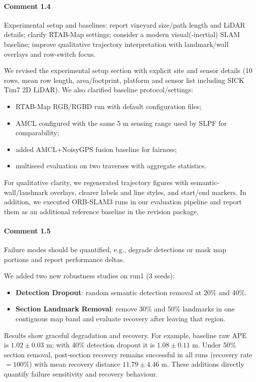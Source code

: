 \documentclass[a4paper]{article}
\def\answer#1#2{\begin{tcolorbox}[width=\textwidth,colback={white},title={\textbf{Answer
 #1}},colbacktitle=answerBoxColor,coltitle=white] #2 \end{tcolorbox} }
\begin{document}
\paragraph{Comment 1.4}
{\color{commentColor}
Experimental setup and baselines: report vineyard size/path length and LiDAR details; clarify RTAB-Map settings; consider a modern visual(-inertial) SLAM baseline; improve qualitative trajectory interpretation with landmark/wall overlays and row-switch focus.
}
\answer{1.4}{
We revised the experimental setup section with explicit site and sensor details (10 rows, mean row length, area/footprint, platform and sensor list including SICK Tim7 2D LiDAR).
We also clarified baseline protocol/settings:
\begin{itemize}
  \item RTAB-Map RGB/RGBD run with default configuration files;
  \item AMCL configured with the same 5 m sensing range used by SLPF for comparability;
  \item added AMCL+NoisyGPS fusion baseline for fairness;
  \item multiseed evaluation on two traverses with aggregate statistics.
\end{itemize}
For qualitative clarity, we regenerated trajectory figures with semantic-wall/landmark overlays, clearer labels and line styles, and start/end markers.
In addition, we executed ORB-SLAM3 runs in our evaluation pipeline and report them as an additional reference baseline in the revision package.
}

\paragraph{Comment 1.5}
{\color{commentColor}
Failure modes should be quantified, e.g., degrade detections or mask map portions and report performance deltas.
}
\answer{1.5}{
We added two new robustness studies on run1 (3 seeds):
\begin{itemize}
  \item \textbf{Detection Dropout}: random semantic detection removal at 20\% and 40\%.
  \item \textbf{Section Landmark Removal}: remove 30\% and 50\% landmarks in one contiguous map band and evaluate recovery after leaving that region.
\end{itemize}
Results show graceful degradation and recovery. For example, baseline raw APE is $1.02\pm0.03$ m; with 40\% detection dropout it is $1.08\pm0.11$ m. Under 50\% section removal, post-section recovery remains successful in all runs (recovery rate $=100\%$) with mean recovery distance $11.79\pm4.46$ m.
These additions directly quantify failure sensitivity and recovery behaviour.
}
\end{document}
